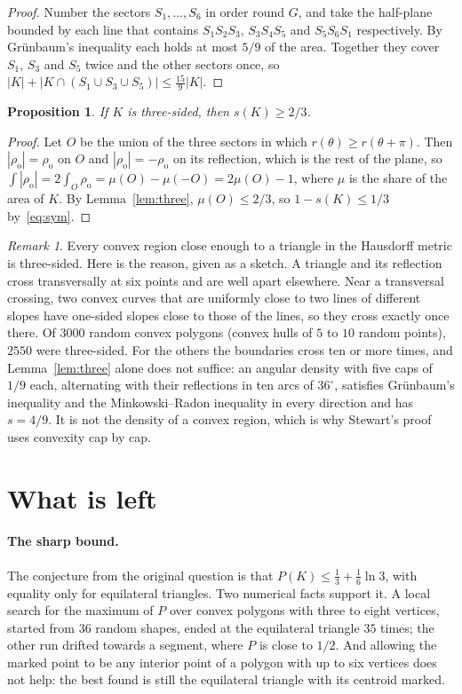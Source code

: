 \documentclass[11pt]{article}
\newtheorem{proposition}{Proposition}
\theoremstyle{remark}
\newtheorem*{remark}{Remark}
\newcommand{\ro}{\rho_{\mathrm o}}
\newcommand{\abs}[1]{\left|#1\right|}
\begin{document}
\begin{proof}
Number the sectors $S_1,\dots,S_6$ in order round $G$, and take the half-plane bounded by each line that
contains $S_1S_2S_3$, $S_3S_4S_5$ and $S_5S_6S_1$ respectively. By Gr\"unbaum's inequality each holds at
most $5/9$ of the area. Together they cover $S_1$, $S_3$ and $S_5$ twice and the other sectors once, so
$\abs{K}+\abs{K\cap(S_1\cup S_3\cup S_5)}\le\tfrac{15}9\abs{K}$.
\end{proof}

\begin{proposition}\label{prop:near}
If $K$ is three-sided, then $s(K)\ge 2/3$.
\end{proposition}

\begin{proof}
Let $O$ be the union of the three sectors in which $r(\theta)\ge r(\theta+\pi)$. Then $\abs{\ro}=\ro$ on
$O$ and $\abs{\ro}=-\ro$ on its reflection, which is the rest of the plane, so
$\int\abs{\ro}=2\int_O\ro=\mu(O)-\mu(-O)=2\mu(O)-1$, where $\mu$ is the share of the area of $K$. By
Lemma~\ref{lem:three}, $\mu(O)\le 2/3$, so $1-s(K)\le 1/3$ by~\eqref{eq:sym}.
\end{proof}

\begin{remark}
Every convex region close enough to a triangle in the Hausdorff metric is three-sided. Here is the
reason, given as a sketch. A triangle and its reflection cross transversally at six points and are
well apart elsewhere. Near a transversal crossing, two convex curves that are uniformly close to two
lines of different slopes have one-sided slopes close to those of the lines, so they cross exactly once
there. Of $3000$ random convex polygons (convex hulls of $5$ to $10$ random points), $2550$ were three-sided.
For the others the boundaries cross ten or more times, and Lemma~\ref{lem:three} alone does not suffice:
an angular density with five caps of $1/9$ each, alternating with their reflections in ten arcs of
$36^\circ$, satisfies Gr\"unbaum's inequality and the Minkowski--Radon inequality in every direction and
has $s=4/9$. It is not the density of a convex region, which is why Stewart's proof uses convexity cap by
cap.
\end{remark}

\section{What is left}\label{sec:left}

\paragraph{The sharp bound.} The conjecture from the original question is that
$P(K)\le\tfrac13+\tfrac16\ln 3$, with equality only for equilateral triangles. Two numerical facts
support it. A local search for the maximum of $P$ over convex polygons with three to eight vertices,
started from $36$ random shapes, ended at the equilateral triangle $35$ times; the other run drifted
towards a segment, where $P$ is close to $1/2$. And allowing the marked point to be any interior point
of a polygon with up to six vertices does not help: the best found is still the equilateral triangle
with its centroid marked.
\end{document}
